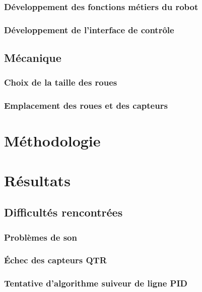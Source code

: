 \documentclass[a4paper, 12pt]{report}
\begin{document}
\subsection{Développement des fonctions métiers du robot}

\subsection{Développement de l'interface de contrôle}
\section{Mécanique}
\subsection{Choix de la taille des roues}
\subsection{Emplacement des roues et des capteurs}

\chapter{Méthodologie}
\lipsum[5-6]

\chapter{Résultats}
\lipsum[7-8]
\section{Difficultés rencontrées}
\subsection{Problèmes de son}
\subsection{Échec des capteurs QTR}
\subsection{Tentative d'algorithme suiveur de ligne PID}
\end{document}
